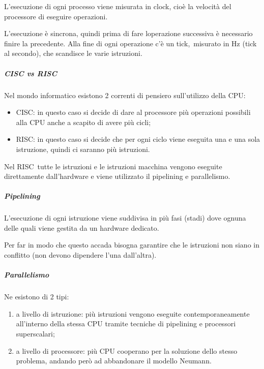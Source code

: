 \documentclass[
]{article}
\providecommand{\tightlist}{%
  \setlength{\itemsep}{0pt}\setlength{\parskip}{0pt}}
\begin{document}
{L'esecuzione di ogni processo viene misurata in }{clock}{, cioè la
velocità del processore di eseguire operazioni.}

{L'esecuzione è sincrona, quindi prima di fare
l\textquotesingle operazione successiva è necessario finire la
precedente. Alla fine di ogni operazione c'è un }{tick}{,}{~}{misurato
in Hz (tick al secondo), che scandisce le varie istruzioni.}

{}

\subparagraph{\texorpdfstring{{CISC vs
RISC}}{CISC vs RISC}}\label{h.egnle06v88j6}

{Nel mondo informatico esistono 2 correnti di pensiero sull'utilizzo
della CPU:}

\begin{itemize}
\tightlist
\item
  {CISC}{: in questo caso si decide di dare al processore più operazioni
  possibili alla CPU anche a scapito di avere }{più cicli}{;}
\item
  {RISC}{: }{in questo caso si decide che per ogni ciclo viene eseguita
  una e una sola istruzione, quindi ci saranno }{più istruzioni}{.}
\end{itemize}

{}

{Nel }{RISC}{~tutte le istruzioni e le istruzioni macchina vengono
eseguite direttamente dall'hardware e viene utilizzato il pipelining e
parallelismo.}

{}

\subparagraph{\texorpdfstring{{Pipelining}}{Pipelining}}\label{h.2ewlbdtsj7xn}

{L'esecuzione di ogni istruzione viene suddivisa in più fasi (}{stadi}{)
dove ognuna delle quali viene gestita da un hardware dedicato.}

{Per far in modo che questo accada bisogna garantire che le istruzioni
non siano in conflitto (non }{d}{evono dipendere l'una dall'altra).}

\subparagraph{\texorpdfstring{{Parallelismo}}{Parallelismo}}\label{h.h00xa9xbp9lo}

{Ne esistono di 2 tipi:}

\begin{enumerate}
\tightlist
\item
  {a livello di istruzione}{: più istruzioni vengono eseguite
  contemporaneamente all'interno della stessa CPU tramite tecniche di
  pipelining e processori superscalari;}
\item
  {a livello di processore}{: più CPU cooperano per la soluzione dello
  stesso problema, andando però ad abbandonare il modello Neumann.}
\end{enumerate}
\end{document}
